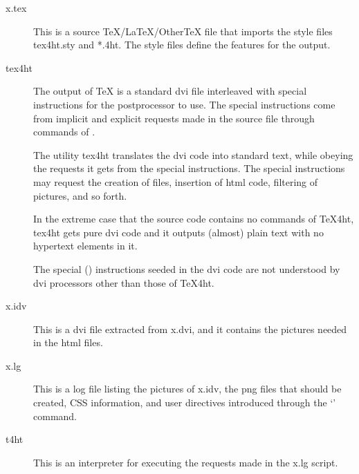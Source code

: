 \begin{description}
  \item[x.tex]

This is a source TeX/LaTeX/OtherTeX file that imports the style files tex4ht.sty and *.4ht. The style files define the features for the output.

\item[tex4ht]

The output of \TeX{} is a standard dvi file interleaved with special
instructions for the postprocessor  to use. The special
instructions come from implicit and explicit requests made in the source file
through commands of \texfourht.

The utility tex4ht translates the dvi code into standard text, while obeying
the requests it gets from the special instructions. The special instructions
may request the creation of files, insertion of html code, filtering of
pictures, and so forth.

In the extreme case that the source code contains no commands of TeX4ht, tex4ht
gets pure dvi code and it outputs (almost) plain text with no hypertext
elements in it.

The special (\texcommand{\special}) instructions seeded in the dvi code are not understood
by dvi processors other than those of TeX4ht.

\item[x.idv]

This is a dvi file extracted from x.dvi, and it contains the pictures needed in
the html files.

\item[x.lg]

This is a log file listing the pictures of x.idv, the png files that should be
created, CSS information, and user directives introduced through the
‘’ command.

\item[t4ht]
This is an interpreter for executing the requests made in the x.lg script.

\end{description}


